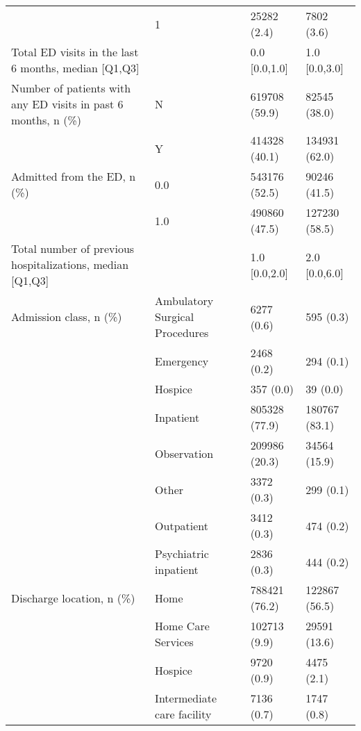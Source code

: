 \begin{tabular}{llll}
                           & 1 &                    25282 (2.4) &         7802 (3.6) \\
Total ED visits in the last 6 months, median [Q1,Q3] &   &                  0.0 [0.0,1.0] &      1.0 [0.0,3.0] \\
Number of patients with any ED visits in past 6 months, n (\%) & N &                  619708 (59.9) &       82545 (38.0) \\
                           & Y &                  414328 (40.1) &      134931 (62.0) \\
Admitted from the ED, n (\%) & 0.0 &                  543176 (52.5) &       90246 (41.5) \\
                           & 1.0 &                  490860 (47.5) &      127230 (58.5) \\
Total number of previous hospitalizations, median [Q1,Q3] &   &                  1.0 [0.0,2.0] &      2.0 [0.0,6.0] \\
Admission class, n (\%) & Ambulatory Surgical Procedures &                     6277 (0.6) &          595 (0.3) \\
                           & Emergency &                     2468 (0.2) &          294 (0.1) \\
                           & Hospice &                      357 (0.0) &           39 (0.0) \\
                           & Inpatient &                  805328 (77.9) &      180767 (83.1) \\
                           & Observation &                  209986 (20.3) &       34564 (15.9) \\
                           & Other &                     3372 (0.3) &          299 (0.1) \\
                           & Outpatient &                     3412 (0.3) &          474 (0.2) \\
                           & Psychiatric inpatient &                     2836 (0.3) &          444 (0.2) \\
Discharge location, n (\%) & Home &                  788421 (76.2) &      122867 (56.5) \\
                           & Home Care Services &                   102713 (9.9) &       29591 (13.6) \\
                           & Hospice &                     9720 (0.9) &         4475 (2.1) \\
                           & Intermediate care facility &                     7136 (0.7) &         1747 (0.8) \\

\end{tabular}
